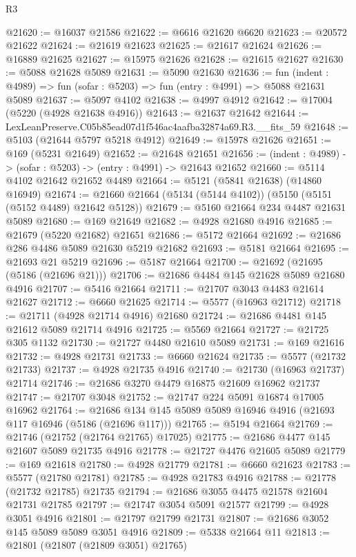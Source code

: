 \begin{lexlean}{R3}
\begin{coremodule}
@21620 := @16037 @21586
@21622 := @6616 @21620 @6620
@21623 := @20572 @21622
@21624 := @21619 @21623
@21625 := @21617 @21624
@21626 := @16889 @21625
@21627 := @15975 @21626
@21628 := @21615 @21627
@21630 := @5088 @21628 @5089
@21631 := @5090 @21630
@21636 := fun (indent : @4989) => fun (sofar : @5203) => fun (entry : @4991) => @5088 @21631 @5089
@21637 := @5097 @4102
@21638 := @4997 @4912
@21642 := @17004 (@5220 (@4928 @21638 @4916))
@21643 := @21637 @21642
@21644 := LexLeanPreserve.C05b85ead07d1f546ac4aafba32874a69.R3.__fits_59
@21648 := @5103 (@21644 @5797 @5218 @4912)
@21649 := @15978 @21626
@21651 := @169 (@5231 @21649)
@21652 := @21648 @21651
@21656 := (indent : @4989) -> (sofar : @5203) -> (entry : @4991) -> @21643 @21652
@21660 := @5114 @4102 @21642 @21652 @4489
@21664 := @5121 (@5841 @21638) (@14860 @16949)
@21674 := @21660 @21664 (@5134 (@5144 @4102)) (@5150 (@5151 (@5152 @4489) @21642 @5128))
@21679 := @5160 @21664 @234 @4487 @21631 @5089
@21680 := @169 @21649
@21682 := @4928 @21680 @4916
@21685 := @21679 (@5220 @21682) @21651
@21686 := @5172 @21664
@21692 := @21686 @286 @4486 @5089 @21630 @5219 @21682
@21693 := @5181 @21664
@21695 := @21693 @21 @5219
@21696 := @5187 @21664
@21700 := @21692 (@21695 (@5186 (@21696 @21)))
@21706 := @21686 @4484 @145 @21628 @5089 @21680 @4916
@21707 := @5416 @21664
@21711 := @21707 @3043 @4483 @21614 @21627
@21712 := @6660 @21625
@21714 := @5577 (@16963 @21712)
@21718 := @21711 (@4928 @21714 @4916) @21680
@21724 := @21686 @4481 @145 @21612 @5089 @21714 @4916
@21725 := @5569 @21664
@21727 := @21725 @305 @1132
@21730 := @21727 @4480 @21610 @5089
@21731 := @169 @21616
@21732 := @4928 @21731
@21733 := @6660 @21624
@21735 := @5577 (@21732 @21733)
@21737 := @4928 @21735 @4916
@21740 := @21730 (@16963 @21737) @21714
@21746 := @21686 @3270 @4479 @16875 @21609 @16962 @21737
@21747 := @21707 @3048
@21752 := @21747 @224 @5091 @16874 @17005 @16962
@21764 := @21686 @134 @145 @5089 @5089 @16946 @4916 (@21693 @117 @16946 (@5186 (@21696 @117)))
@21765 := @5194 @21664
@21769 := @21746 (@21752 (@21764 @21765) @17025)
@21775 := @21686 @4477 @145 @21607 @5089 @21735 @4916
@21778 := @21727 @4476 @21605 @5089
@21779 := @169 @21618
@21780 := @4928 @21779
@21781 := @6660 @21623
@21783 := @5577 (@21780 @21781)
@21785 := @4928 @21783 @4916
@21788 := @21778 (@21732 @21785) @21735
@21794 := @21686 @3055 @4475 @21578 @21604 @21731 @21785
@21797 := @21747 @3054 @5091 @21577
@21799 := @4928 @3051 @4916
@21801 := @21797 @21799 @21731
@21807 := @21686 @3052 @145 @5089 @5089 @3051 @4916
@21809 := @5338 @21664 @11
@21813 := @21801 (@21807 (@21809 @3051) @21765)

\end{coremodule}
\end{lexlean}
